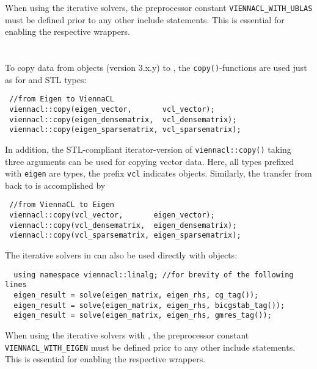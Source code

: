 When using the iterative solvers, the preprocessor constant \texttt{VIENNACL\_WITH\_UBLAS} must be defined prior to any other {\ViennaCL} include statements.
This is essential for enabling the respective wrappers.


\section{\Eigen}
To copy data from {\Eigen} \cite{eigen} objects (version 3.x.y) to {\ViennaCL}, the \texttt{copy()}-functions are used just as for {\ublas} and STL types:
\begin{lstlisting}
 //from Eigen to ViennaCL
 viennacl::copy(eigen_vector,       vcl_vector);
 viennacl::copy(eigen_densematrix,  vcl_densematrix);
 viennacl::copy(eigen_sparsematrix, vcl_sparsematrix);
\end{lstlisting}
In addition, the STL-compliant iterator-version of \texttt{viennacl::copy()} taking three arguments can be used for copying vector data.
Here, all types prefixed with \texttt{eigen} are {\Eigen} types, the prefix \texttt{vcl} indicates {\ViennaCL} objects.
Similarly, the transfer from {\ViennaCL} back to {\Eigen} is accomplished by
\begin{lstlisting}
 //from ViennaCL to Eigen
 viennacl::copy(vcl_vector,       eigen_vector);
 viennacl::copy(vcl_densematrix,  eigen_densematrix);
 viennacl::copy(vcl_sparsematrix, eigen_sparsematrix);
\end{lstlisting}

The iterative solvers in {\ViennaCL} can also be used directly with {\Eigen} objects:
\begin{lstlisting}
  using namespace viennacl::linalg; //for brevity of the following lines
  eigen_result = solve(eigen_matrix, eigen_rhs, cg_tag());
  eigen_result = solve(eigen_matrix, eigen_rhs, bicgstab_tag());
  eigen_result = solve(eigen_matrix, eigen_rhs, gmres_tag());
\end{lstlisting}
When using the iterative solvers with {\Eigen}, the preprocessor constant \texttt{VIENNACL\_WITH\_EIGEN} must be defined prior to any other {\ViennaCL} include statements.
This is essential for enabling the respective wrappers.





